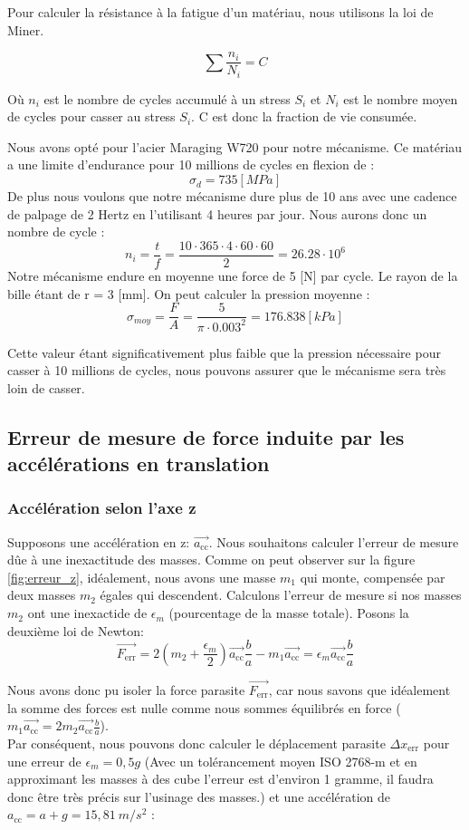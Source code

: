 \documentclass[a4paper, 11pt]{article} %
\begin{document}
Pour calculer la résistance à la fatigue d'un matériau, nous utilisons la loi de Miner.

\[
\sum\frac{n_i}{N_i} = C
\]

Où $n_i$ est le nombre de cycles accumulé à un stress $S_i$ et $N_i$ est le nombre moyen de cycles pour casser au stress $S_i$. C est donc la fraction de vie consumée.

Nous avons opté pour l'acier Maraging W720 pour notre mécanisme. Ce matériau a une limite d'endurance pour 10 millions de cycles en flexion de :
\[
\sigma_d = 735 [MPa]
\]
De plus nous voulons que notre mécanisme dure plus de 10 ans avec une cadence de palpage de 2 Hertz en l'utilisant 4 heures par jour. Nous aurons donc un nombre de cycle :
\[
n_i = \frac{t}{f} = \frac{10\cdot365\cdot4\cdot60\cdot60}{2} = 26.28 \cdot 10^6
\]
Notre mécanisme endure en moyenne une force de 5 [N] par cycle. Le rayon de la bille étant de r = 3 [mm]. On peut calculer la pression moyenne :
\[
\sigma_{moy} = \frac{F}{A} = \frac{5}{\pi \cdot 0.003^2} = 176.838 [kPa]
\]

Cette valeur étant significativement plus faible que la pression nécessaire pour casser à 10 millions de cycles, nous pouvons assurer que le mécanisme sera très loin de casser.



\subsection{Erreur de mesure de force induite par les accélérations en translation}\label{sub:erreur_mesure}


\subsubsection*{Accélération selon l'axe z}
Supposons une accélération en z: $\vec{a_\text{cc}}$. Nous souhaitons calculer l'erreur de mesure dûe à une inexactitude des masses. Comme on peut observer sur la figure \ref{fig:erreur_z}, idéalement, nous avons une masse $m_1$ qui monte, compensée par deux masses $m_2$ égales qui descendent. Calculons l'erreur de mesure si nos masses $m_2$ ont une inexactide de $\epsilon_m$ (pourcentage de la masse totale).
Posons la deuxième loi de Newton:
$$\vec{F_\text{err}} = 2(m_2 + \frac{\epsilon_m}{2} )\vec{a_\text{cc}}\frac{b}{a}- m_1\vec{a_\text{cc}} = \epsilon_m\vec{a_\text{cc}}\frac{b}{a}$$

Nous avons donc pu isoler la force parasite $\vec{F_\text{err}}$, car nous savons que idéalement la somme des forces est nulle comme nous sommes équilibrés en force ($m_1\vec{a_\text{cc}}=2m_2\vec{a_\text{cc}}\frac{b}{a}$).
\\Par conséquent, nous pouvons donc calculer le déplacement parasite $\Delta x_\text{err}$ pour une erreur de $\epsilon_m = 0,5g$ (Avec un tolérancement moyen ISO 2768-m et en approximant les masses à des cube l'erreur est d'environ 1 gramme, il faudra donc être très précis sur l'usinage des masses.) et une accélération de $a_\text{cc} = a + g = 15,81 \ m/s^2$ :
\end{document}
